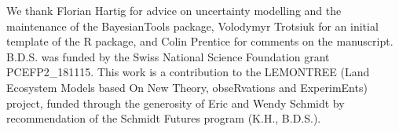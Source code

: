 \documentclass[gmd, manuscript]{copernicus}
\begin{document}
\noappendix       %






\begin{acknowledgements}
We thank Florian Hartig for advice on uncertainty modelling and the maintenance of the BayesianTools package, Volodymyr Trotsiuk for an initial template of the R package, and Colin Prentice for comments on the manuscript. B.D.S. was funded by the Swiss National Science Foundation grant PCEFP2\_181115. This work is a contribution to the LEMONTREE (Land Ecosystem Models based On New Theory, obseRvations and ExperimEnts) project, funded through the generosity of Eric and Wendy Schmidt by recommendation of the Schmidt Futures program (K.H., B.D.S.).

\end{acknowledgements}





\end{document}
